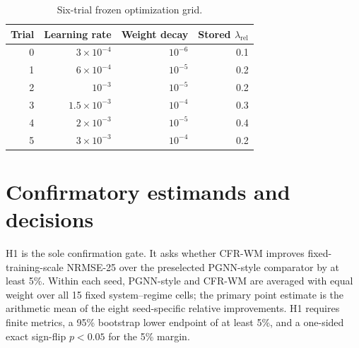 \begin{table}[ht]
\centering
\caption{Six-trial frozen optimization grid.}
\label{tab:tuning-grid}
\begin{tabular}{rrrr}
\toprule
Trial & Learning rate & Weight decay & Stored $\lambda_{\mathrm{rel}}$ \\
\midrule
0 & $3\times10^{-4}$ & $10^{-6}$ & 0.1 \\
1 & $6\times10^{-4}$ & $10^{-5}$ & 0.2 \\
2 & $10^{-3}$ & $10^{-5}$ & 0.2 \\
3 & $1.5\times10^{-3}$ & $10^{-4}$ & 0.3 \\
4 & $2\times10^{-3}$ & $10^{-5}$ & 0.4 \\
5 & $3\times10^{-3}$ & $10^{-4}$ & 0.2 \\
\bottomrule
\end{tabular}
\end{table}

\begin{table}[ht]
\centering
\caption{Frozen winning trial index by system and protocol-matched baseline.}
\label{tab:tuning-winners}
\end{table}

\section{Confirmatory estimands and decisions}

H1 is the sole confirmation gate. It asks whether CFR-WM improves fixed-training-scale NRMSE-25 over the preselected PGNN-style comparator by at least 5\%. Within each seed, PGNN-style and CFR-WM are averaged with equal weight over all 15 fixed system--regime cells; the primary point estimate is the arithmetic mean of the eight seed-specific relative improvements. H1 requires finite metrics, a 95\% bootstrap lower endpoint of at least 5\%, and a one-sided exact sign-flip $p<0.05$ for the 5\% margin.

